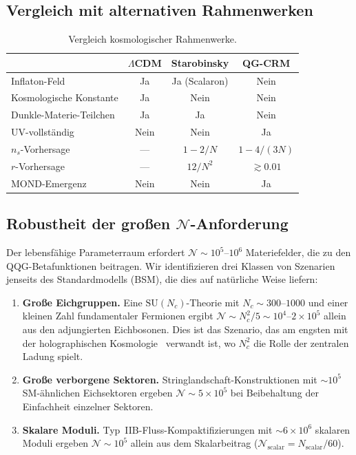 \documentclass[aps,prd,twocolumn,superscriptaddress,nofootinbib]{revtex4-2}
\begin{document}
\subsection{Vergleich mit alternativen Rahmenwerken}

\begin{table}[h]
\caption{Vergleich kosmologischer Rahmenwerke.}
\scriptsize
\setlength{\tabcolsep}{2pt}
\begin{tabular}{lccc}
\toprule
 & $\Lambda$CDM & Starobinsky & QG-CRM \\
\midrule
Inflaton-Feld & Ja & Ja (Scalaron) & Nein \\
Kosmologische Konstante & Ja & Nein & Nein \\
Dunkle-Materie-Teilchen & Ja & Ja & Nein \\
UV-vollständig & Nein & Nein & Ja \\
$n_s$-Vorhersage & --- & $1-2/N$ & $1-4/(3N)$ \\
$r$-Vorhersage & --- & $12/N^2$ & $\gtrsim 0.01$ \\
MOND-Emergenz & Nein & Nein & Ja \\
\bottomrule
\end{tabular}
\label{tab:comparison}
\end{table}

\subsection{Robustheit der großen $\mathcal{N}$-Anforderung}
\label{sec:large-n}

Der lebensfähige Parameterraum erfordert $\mathcal{N} \sim 10^5$--$10^6$ Materiefelder, die zu den QQG-Betafunktionen beitragen. Wir identifizieren drei Klassen von Szenarien jenseits des Standardmodells (BSM), die dies auf natürliche Weise liefern:

\begin{enumerate}
\item \textbf{Große Eichgruppen.} Eine $\mathrm{SU}(N_c)$-Theorie mit $N_c \sim 300$--$1000$ und einer kleinen Zahl fundamentaler Fermionen ergibt $\mathcal{N} \sim N_c^2/5 \sim 10^4$--$2 \times 10^5$ allein aus den adjungierten Eichbosonen. Dies ist das Szenario, das am engsten mit der holographischen Kosmologie~\cite{Afshordi2017} verwandt ist, wo $N_c^2$ die Rolle der zentralen Ladung spielt.

\item \textbf{Große verborgene Sektoren.} Stringlandschaft-Konstruktionen mit $\sim 10^5$ SM-ähnlichen Eichsektoren ergeben $\mathcal{N} \sim 5 \times 10^5$ bei Beibehaltung der Einfachheit einzelner Sektoren.

\item \textbf{Skalare Moduli.} Typ~IIB-Fluss-Kompaktifizierungen mit $\sim 6 \times 10^6$ skalaren Moduli ergeben $\mathcal{N} \sim 10^5$ allein aus dem Skalarbeitrag ($\mathcal{N}_\mathrm{scalar} = N_\mathrm{scalar}/60$).
\end{enumerate}
\end{document}
